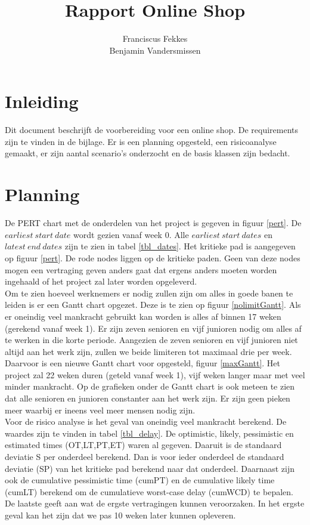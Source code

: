 \documentclass[•]{article}
\title{Rapport Online Shop}
\author{Franciscus Fekkes \\ Benjamin Vandersmissen}
\begin{document}
\maketitle
\tableofcontents
\newpage
\section{Inleiding}
Dit document beschrijft de voorbereiding voor een online shop. De requirements zijn te vinden in de bijlage. Er is een planning opgesteld, een risicoanalyse gemaakt, er zijn aantal scenario's onderzocht en de basis klassen zijn bedacht.\\

\section{Planning}
De PERT chart met de onderdelen van het project is gegeven in figuur \ref{pert}. De $earliest\ start\ date$ wordt gezien vanaf week $0$. Alle $earliest\ start\ dates$ en $latest\ end\ dates$ zijn te zien in tabel \ref{tbl_dates}. Het kritieke pad is aangegeven op figuur \ref{pert}. De rode nodes liggen op de kritieke paden. Geen van deze nodes mogen een vertraging geven anders gaat dat ergens anders moeten worden ingehaald of het project zal later worden opgeleverd.\\
Om te zien hoeveel werknemers er nodig zullen zijn om alles in goede banen te leiden is er een Gantt chart opgezet. Deze is te zien op figuur \ref{nolimitGantt}. Als er oneindig veel mankracht gebruikt kan worden is alles af binnen 17 weken (gerekend vanaf week 1). Er zijn zeven senioren en vijf junioren nodig om alles af te werken in die korte periode. Aangezien de zeven senioren en vijf junioren niet altijd aan het werk zijn, zullen we beide limiteren tot maximaal drie per week. Daarvoor is een nieuwe Gantt chart voor opgesteld, figuur \ref{maxGantt}. Het project zal 22 weken duren (geteld vanaf week 1), vijf weken langer maar met veel minder mankracht. Op de grafieken onder de Gantt chart is ook meteen te zien dat alle senioren en junioren constanter aan het werk zijn. Er zijn geen pieken meer waarbij er ineens veel meer mensen nodig zijn.\\
Voor de risico analyse is het geval van oneindig veel mankracht berekend. De waardes zijn te vinden in tabel \ref{tbl_delay}. De optimistic, likely, pessimistic en estimated times (OT,LT,PT,ET) waren al gegeven. Daaruit is de standaard deviatie S per onderdeel berekend. Dan is voor ieder onderdeel de standaard deviatie (SP) van het kritieke pad berekend naar dat onderdeel. Daarnaast zijn ook de cumulative pessimistic time (cumPT) en de cumulative likely time (cumLT) berekend om de cumulatieve worst-case delay (cumWCD) te bepalen. De laatste geeft aan wat de ergste vertragingen kunnen veroorzaken. In het ergste geval kan het zijn dat we pas 10 weken later kunnen opleveren.
\end{document}
